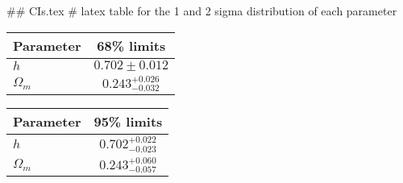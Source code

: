 ## CIs.tex
# latex table for the 1 and 2 sigma distribution of each parameter

\begin{tabular} { l  c}
 Parameter &  68\% limits\\
\hline
{\boldmath$h              $} & $0.702\pm 0.012            $\\
{\boldmath$\Omega_m       $} & $0.243^{+0.026}_{-0.032}   $\\
\hline
\end{tabular}

\begin{tabular} { l  c}
 Parameter &  95\% limits\\
\hline
{\boldmath$h              $} & $0.702^{+0.022}_{-0.023}   $\\
{\boldmath$\Omega_m       $} & $0.243^{+0.060}_{-0.057}   $\\
\hline
\end{tabular}

